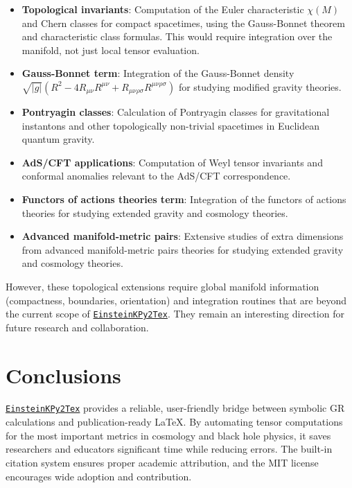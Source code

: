 \documentclass[11pt,a4paper]{article}
\begin{document}
\begin{itemize}
    \item \textbf{Topological invariants}: Computation of the Euler characteristic $\chi(M)$ and Chern classes for compact spacetimes, using the Gauss-Bonnet theorem and characteristic class formulas. This would require integration over the manifold, not just local tensor evaluation.

    \item \textbf{Gauss-Bonnet term}: Integration of the Gauss-Bonnet density $\sqrt{|g|}(R^2 - 4R_{\mu\nu}R^{\mu\nu} + R_{\mu\nu\rho\sigma}R^{\mu\nu\rho\sigma})$ for studying modified gravity theories.    

    \item \textbf{Pontryagin classes}: Calculation of Pontryagin classes for gravitational instantons and other topologically non-trivial spacetimes in Euclidean quantum gravity.

    \item \textbf{AdS/CFT applications}: Computation of Weyl tensor invariants and conformal anomalies relevant to the AdS/CFT correspondence.

    \item \textbf{Functors of actions theories term}: Integration of the functors of actions theories \cite{Ntelis2023} for studying extended gravity and cosmology theories.    

    \item \textbf{Advanced manifold-metric pairs}: Extensive studies of extra dimensions from advanced manifold-metric pairs theories \cite{Ntelis2025_AMMP} for studying extended gravity and cosmology theories.    

\end{itemize}

However, these topological extensions require global manifold information (compactness, boundaries, orientation) and integration routines that are beyond the current scope of \href{https://github.com/lontelis/Einsteinpy_to_latex}{{\color{cyan}\texttt{EinsteinKPy2Tex}}}. They remain an interesting direction for future research and collaboration.

\section{Conclusions}

\href{https://github.com/lontelis/Einsteinpy_to_latex}{{\color{cyan}\texttt{EinsteinKPy2Tex}}} provides a reliable, user-friendly bridge between symbolic GR calculations and publication-ready \LaTeX. By automating tensor computations for the most important metrics in cosmology and black hole physics, it saves researchers and educators significant time while reducing errors. The built-in citation system ensures proper academic attribution, and the MIT license encourages wide adoption and contribution.
\end{document}
